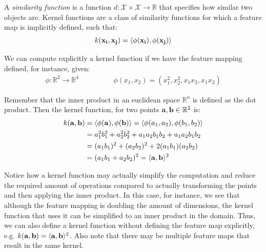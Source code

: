 A \emph{similarity function} is a function $d : \mathcal{X \times X} \rightarrow \mathbb{R}$ that specifies how similar two objects are. Kernel functions are a class of similarity functions for which a feature map is implicitly defined, such that:
\begin{align}
    k(\mathbf{x_i}, \mathbf{x_j}) = \langle\phi(\mathbf{x_i}), \phi(\mathbf{x_j})\rangle
\end{align}

We can compute explicitly a kernel function if we have the feature mapping defined, for instance, given:
\begin{align*}
    \phi : \mathbb{R}^2 \rightarrow \mathbb{R}^4 &
    \qquad\qquad
    \phi(x_1, x_2) = (x_1^2, x_2^2, x_1x_2, x_1x_2)
\end{align*}

Remember that the inner product in an euclidean space $\mathbb{R}^n$ is defined as the dot product. Then the kernel function, for two points $\mathbf{a}, \mathbf{b} \in \mathbb{R}^2$ is:
\begin{align*}
    k(\mathbf{a}, \mathbf{b}) &= \langle\phi(\mathbf{a}), \phi(\mathbf{b})\rangle = \langle\phi(a_1, a_2), \phi(b_1, b_2)\rangle \\
    &= a_1^2b_1^2 + a_2^2b_2^2 + a_1a_2b_1b_2 + a_1a_2b_1b_2 \\
    &= (a_1b_1)^2 + (a_2b_2)^2 + 2(a_1b_1)(a_2b_2) \\
    &= (a_1b_1 + a_2b_2)^2 = \langle\mathbf{a}, \mathbf{b}\rangle^2
\end{align*}

Notice how a kernel function may actually simplify the computation and reduce the required amount of operations compared to actually transforming the points and then applying the inner product. In this case, for in\-stance, we see that although the feature mapping is doubling the amount of di\-men\-sions, the kernel function that uses it can be simplified to an inner product in the domain. Thus, we can also define a kernel function without defining the feature map explicitly, e.g. $k(\mathbf{a}, \mathbf{b}) = \langle\mathbf{a}, \mathbf{b}\rangle^2$. Also note that there may be multiple feature maps that result in the same kernel. 

